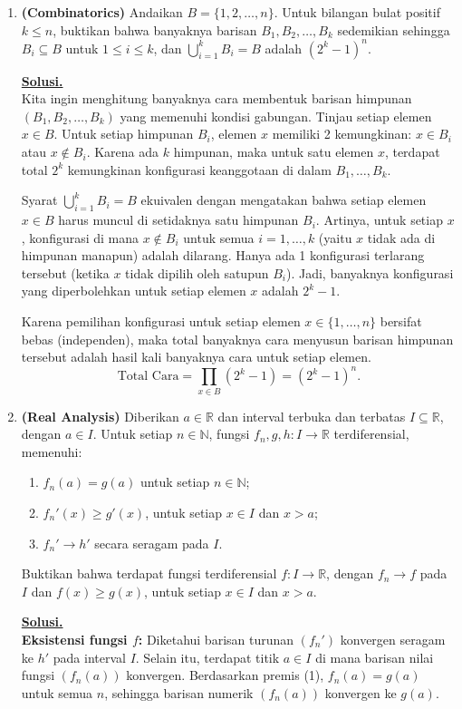 \documentclass[12pt,twoside]{article}
\newenvironment{solution}
{
	\par\noindent\textbf{\underline{Solusi.}}\\
}
{
	\par
}
\begin{document}
\begin{enumerate}
  \item \textbf{(Combinatorics)} Andaikan $B = \{1, 2, \dots, n\}$. Untuk bilangan bulat positif $k \leq n$, buktikan bahwa banyaknya barisan $B_1, B_2, \dots, B_k$ sedemikian sehingga $B_i \subseteq B$ untuk $1 \leq i \leq k$, dan $\bigcup_{i=1}^k B_i = B$ adalah $(2^k - 1)^n$.
        \begin{solution}
          Kita ingin menghitung banyaknya cara membentuk barisan himpunan $(B_1, B_2, \dots, B_k)$ yang memenuhi kondisi gabungan.
          Tinjau setiap elemen $x \in B$. Untuk setiap himpunan $B_i$, elemen $x$ memiliki 2 kemungkinan: $x \in B_i$ atau $x \notin B_i$.
          Karena ada $k$ himpunan, maka untuk satu elemen $x$, terdapat total $2^k$ kemungkinan konfigurasi keanggotaan di dalam $B_1, \dots, B_k$.

          Syarat $\bigcup_{i=1}^k B_i = B$ ekuivalen dengan mengatakan bahwa setiap elemen $x \in B$ harus muncul di setidaknya satu himpunan $B_i$.
          Artinya, untuk setiap $x$, konfigurasi di mana $x \notin B_i$ untuk semua $i=1,\dots,k$ (yaitu $x$ tidak ada di himpunan manapun) adalah dilarang.
          Hanya ada 1 konfigurasi terlarang tersebut (ketika $x$ tidak dipilih oleh satupun $B_i$).
          Jadi, banyaknya konfigurasi yang diperbolehkan untuk setiap elemen $x$ adalah $2^k - 1$.

          Karena pemilihan konfigurasi untuk setiap elemen $x \in \{1, \dots, n\}$ bersifat bebas (independen), maka total banyaknya cara menyusun barisan himpunan tersebut adalah hasil kali banyaknya cara untuk setiap elemen.
          \[ \text{Total Cara} = \prod_{x \in B} (2^k - 1) = (2^k - 1)^n. \]
        \end{solution}

  \item \textbf{(Real Analysis)} Diberikan $a \in \mathbb{R}$ dan interval terbuka dan terbatas $I \subseteq \mathbb{R}$, dengan $a \in I$. Untuk setiap $n \in \mathbb{N}$, fungsi $f_n, g, h : I \to \mathbb{R}$ terdiferensial, memenuhi:
        \begin{enumerate}
          \item $f_n(a) = g(a)$ untuk setiap $n \in \mathbb{N}$;
          \item $f_n'(x) \geq g'(x)$, untuk setiap $x \in I$ dan $x > a$;
          \item $f_n' \to h'$ secara seragam pada $I$.
        \end{enumerate}
        Buktikan bahwa terdapat fungsi terdiferensial $f : I \to \mathbb{R}$, dengan $f_n \to f$ pada $I$ dan $f(x) \geq g(x)$, untuk setiap $x \in I$ dan $x > a$.
        \begin{solution}
          \textbf{Eksistensi fungsi $f$:}
          Diketahui barisan turunan $(f_n')$ konvergen seragam ke $h'$ pada interval $I$.
          Selain itu, terdapat titik $a \in I$ di mana barisan nilai fungsi $(f_n(a))$ konvergen. Berdasarkan premis (1), $f_n(a) = g(a)$ untuk semua $n$, sehingga barisan numerik $(f_n(a))$ konvergen ke $g(a)$.


\end{solution}
\end{enumerate}
\end{document}
